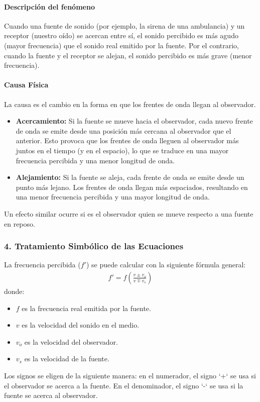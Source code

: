 \paragraph{Descripción del fenómeno}
Cuando una fuente de sonido (por ejemplo, la sirena de una ambulancia) y un receptor (nuestro oído) se acercan entre sí, el sonido percibido es más agudo (mayor frecuencia) que el sonido real emitido por la fuente. Por el contrario, cuando la fuente y el receptor se alejan, el sonido percibido es más grave (menor frecuencia).

\paragraph{Causa Física}
La causa es el cambio en la forma en que los frentes de onda llegan al observador.
\begin{itemize}
    \item \textbf{Acercamiento:} Si la fuente se mueve hacia el observador, cada nuevo frente de onda se emite desde una posición más cercana al observador que el anterior. Esto provoca que los frentes de onda lleguen al observador más juntos en el tiempo (y en el espacio), lo que se traduce en una mayor frecuencia percibida y una menor longitud de onda.
    \item \textbf{Alejamiento:} Si la fuente se aleja, cada frente de onda se emite desde un punto más lejano. Los frentes de onda llegan más espaciados, resultando en una menor frecuencia percibida y una mayor longitud de onda.
\end{itemize}
Un efecto similar ocurre si es el observador quien se mueve respecto a una fuente en reposo.

\subsubsection*{4. Tratamiento Simbólico de las Ecuaciones}
La frecuencia percibida ($f'$) se puede calcular con la siguiente fórmula general:
\begin{gather}
    f' = f \left( \frac{v \pm v_o}{v \mp v_s} \right)
\end{gather}
donde:
\begin{itemize}
    \item $f$ es la frecuencia real emitida por la fuente.
    \item $v$ es la velocidad del sonido en el medio.
    \item $v_o$ es la velocidad del observador.
    \item $v_s$ es la velocidad de la fuente.
\end{itemize}
Los signos se eligen de la siguiente manera: en el numerador, el signo `+` se usa si el observador se acerca a la fuente. En el denominador, el signo `-` se usa si la fuente se acerca al observador.

